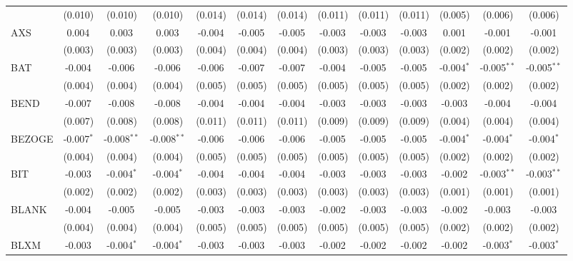 \begin{table}[!htbp]
\begin{tabular}{@{\extracolsep{5pt}}lcccccccccccc}
  & (0.010) & (0.010) & (0.010) & (0.014) & (0.014) & (0.014) & (0.011) & (0.011) & (0.011) & (0.005) & (0.006) & (0.006) \\
 AXS & 0.004$^{}$ & 0.003$^{}$ & 0.003$^{}$ & -0.004$^{}$ & -0.005$^{}$ & -0.005$^{}$ & -0.003$^{}$ & -0.003$^{}$ & -0.003$^{}$ & 0.001$^{}$ & -0.001$^{}$ & -0.001$^{}$ \\
  & (0.003) & (0.003) & (0.003) & (0.004) & (0.004) & (0.004) & (0.003) & (0.003) & (0.003) & (0.002) & (0.002) & (0.002) \\
 BAT & -0.004$^{}$ & -0.006$^{}$ & -0.006$^{}$ & -0.006$^{}$ & -0.007$^{}$ & -0.007$^{}$ & -0.004$^{}$ & -0.005$^{}$ & -0.005$^{}$ & -0.004$^{*}$ & -0.005$^{**}$ & -0.005$^{**}$ \\
  & (0.004) & (0.004) & (0.004) & (0.005) & (0.005) & (0.005) & (0.005) & (0.005) & (0.005) & (0.002) & (0.002) & (0.002) \\
 BEND & -0.007$^{}$ & -0.008$^{}$ & -0.008$^{}$ & -0.004$^{}$ & -0.004$^{}$ & -0.004$^{}$ & -0.003$^{}$ & -0.003$^{}$ & -0.003$^{}$ & -0.003$^{}$ & -0.004$^{}$ & -0.004$^{}$ \\
  & (0.007) & (0.008) & (0.008) & (0.011) & (0.011) & (0.011) & (0.009) & (0.009) & (0.009) & (0.004) & (0.004) & (0.004) \\
 BEZOGE & -0.007$^{*}$ & -0.008$^{**}$ & -0.008$^{**}$ & -0.006$^{}$ & -0.006$^{}$ & -0.006$^{}$ & -0.005$^{}$ & -0.005$^{}$ & -0.005$^{}$ & -0.004$^{*}$ & -0.004$^{*}$ & -0.004$^{*}$ \\
  & (0.004) & (0.004) & (0.004) & (0.005) & (0.005) & (0.005) & (0.005) & (0.005) & (0.005) & (0.002) & (0.002) & (0.002) \\
 BIT & -0.003$^{}$ & -0.004$^{*}$ & -0.004$^{*}$ & -0.004$^{}$ & -0.004$^{}$ & -0.004$^{}$ & -0.003$^{}$ & -0.003$^{}$ & -0.003$^{}$ & -0.002$^{}$ & -0.003$^{**}$ & -0.003$^{**}$ \\
  & (0.002) & (0.002) & (0.002) & (0.003) & (0.003) & (0.003) & (0.003) & (0.003) & (0.003) & (0.001) & (0.001) & (0.001) \\
 BLANK & -0.004$^{}$ & -0.005$^{}$ & -0.005$^{}$ & -0.003$^{}$ & -0.003$^{}$ & -0.003$^{}$ & -0.002$^{}$ & -0.003$^{}$ & -0.003$^{}$ & -0.002$^{}$ & -0.003$^{}$ & -0.003$^{}$ \\
  & (0.004) & (0.004) & (0.004) & (0.005) & (0.005) & (0.005) & (0.005) & (0.005) & (0.005) & (0.002) & (0.002) & (0.002) \\
 BLXM & -0.003$^{}$ & -0.004$^{*}$ & -0.004$^{*}$ & -0.003$^{}$ & -0.003$^{}$ & -0.003$^{}$ & -0.002$^{}$ & -0.002$^{}$ & -0.002$^{}$ & -0.002$^{}$ & -0.003$^{*}$ & -0.003$^{*}$ \\

\end{tabular}
\end{table}
